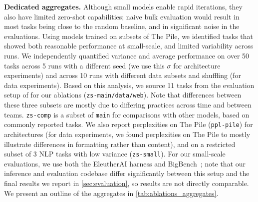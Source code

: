 \documentclass{article}
\begin{document}
\textbf{Dedicated aggregates.} Although small models enable rapid iterations, they also have limited zero-shot capabilities; naive bulk evaluation would result in most tasks being close to the random baseline, and in significant noise in the evaluations. Using models trained on subsets of The Pile, we identified tasks that showed both reasonable performance at small-scale, and limited variability across runs. We independently quantified variance and average performance on over 50 tasks across 5 runs with a different seed (we use this $\sigma$ for architecture experiments) and across 10 runs with different data subsets and shuffling (for data experiments). Based on this analysis, we source 11 tasks from the evaluation setup of \citet{brown2020gpt3,le2022language,srivastava2023beyond} for our ablations (\texttt{zs-main/data/web}). Note that differences between these three subsets are mostly due to differing practices across time and between teams. \texttt{zs-comp} is a subset of \texttt{main} for comparisons with other models, based on commonly reported tasks. We also report perplexities on The Pile \citep{gao2020pile} (\texttt{ppl-pile}) for architectures (for data experiments, we found perplexities on The Pile to mostly illustrate differences in formatting rather than content), and on a restricted subset of 3 NLP tasks with low variance (\texttt{zs-small}). For our small-scale evaluations, we use both the EleutherAI harness \citep{eval-harness} and BigBench~\citep{srivastava2023beyond}; note that our inference and evaluation codebase differ significantly between this setup and the final results we report in \cref{sec:evaluation}, so results are not directly comparable. We present an outline of the aggregates in \cref{tab:ablations_aggregates}.
\end{document}
